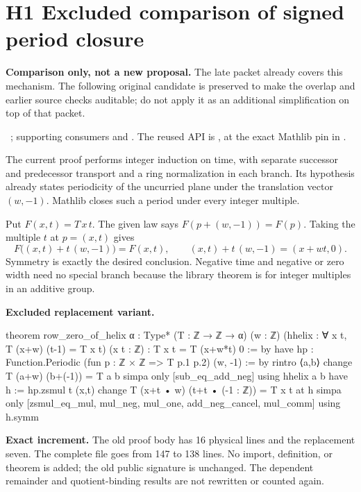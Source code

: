 \section{H1 Excluded comparison of signed period closure}

\textbf{Comparison only, not a new proposal.} The late packet already covers this mechanism. The following original candidate is preserved to make the overlap and earlier source checks auditable; do not apply it as an additional simplification on top of that packet.

\ ; supporting consumers  and . The reused API is , at the exact Mathlib pin in .

The current  proof performs integer induction on time, with separate successor and predecessor transport and a ring normalization in each branch. Its hypothesis already states periodicity of the uncurried plane under the translation vector $(w,-1)$. Mathlib closes such a period under every integer multiple.

Put $F(x,t)=T\,x\,t$. The given law says $F(p+(w,-1))=F(p)$. Taking the multiple $t$ at $p=(x,t)$ gives
\[
 F\big((x,t)+t\,(w,-1)\big)=F(x,t),\qquad
 (x,t)+t\,(w,-1)=(x+wt,0).
\]
Symmetry is exactly the desired conclusion. Negative time and negative or zero width need no special branch because the library theorem is for integer multiples in an additive group.

\textbf{Excluded replacement variant.}
\begin{Lean}
theorem row_zero_of_helix {α : Type*} (T : ℤ → ℤ → α) (w : ℤ)
    (hhelix : ∀ x t, T (x+w) (t-1) = T x t) (x t : ℤ) :
    T x t = T (x+w*t) 0 := by
  have hp : Function.Periodic (fun p : ℤ × ℤ => T p.1 p.2) (w, -1) := by
    rintro ⟨a,b⟩
    change T (a+w) (b+(-1)) = T a b
    simpa only [sub_eq_add_neg] using hhelix a b
  have h := hp.zsmul t (x,t)
  change T (x+t • w) (t+t • (-1 : ℤ)) = T x t at h
  simpa only [zsmul_eq_mul, mul_neg, mul_one, add_neg_cancel, mul_comm] using h.symm
\end{Lean}

\textbf{Exact increment.} The old proof body has 16 physical lines and the replacement seven. The complete file goes from 147 to 138 lines. No import, definition, or theorem is added; the old public signature is unchanged. The dependent remainder and quotient-binding results are not rewritten or counted again.

